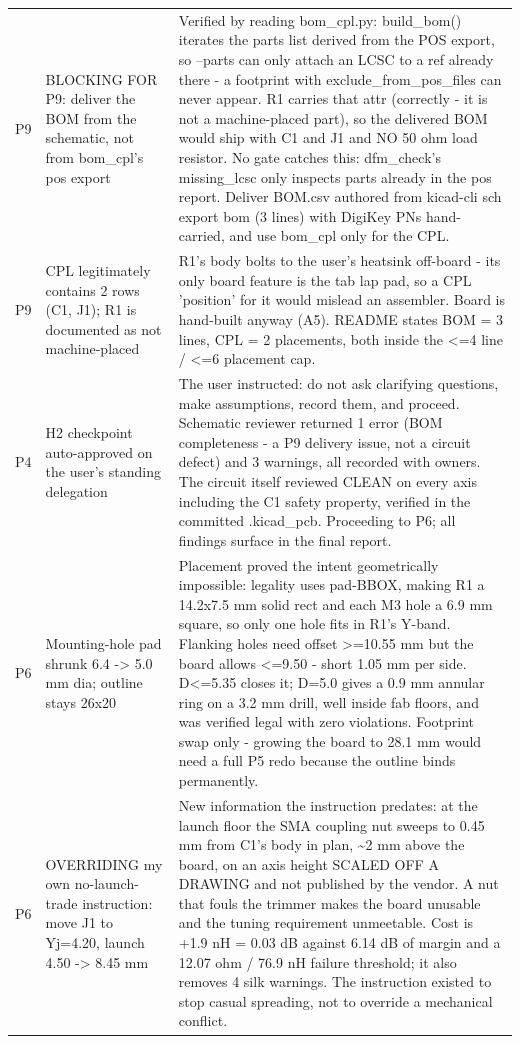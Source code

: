 \documentclass[11pt,a4paper]{article}
\begin{document}
{\begin{longtable}{lp{5.2cm}p{7.2cm}}
P9 & BLOCKING FOR P9: deliver the BOM from the schematic, not from bom\_cpl's pos export & Verified by reading bom\_cpl.py: build\_bom() iterates the parts list derived from the POS export, so --parts can only attach an LCSC to a ref already there - a footprint with exclude\_from\_pos\_files can never appear. R1 carries that attr (correctly - it is not a machine-placed part), so the delivered BOM would ship with C1 and J1 and NO 50 ohm load resistor. No gate catches this: dfm\_check's missing\_lcsc only inspects parts already in the pos report. Deliver BOM.csv authored from kicad-cli sch export bom (3 lines) with DigiKey PNs hand-carried, and use bom\_cpl only for the CPL. \\
P9 & CPL legitimately contains 2 rows (C1, J1); R1 is documented as not machine-placed & R1's body bolts to the user's heatsink off-board - its only board feature is the tab lap pad, so a CPL 'position' for it would mislead an assembler. Board is hand-built anyway (A5). README states BOM = 3 lines, CPL = 2 placements, both inside the \textless{}=4 line / \textless{}=6 placement cap. \\
P4 & H2 checkpoint auto-approved on the user's standing delegation & The user instructed: do not ask clarifying questions, make assumptions, record them, and proceed. Schematic reviewer returned 1 error (BOM completeness - a P9 delivery issue, not a circuit defect) and 3 warnings, all recorded with owners. The circuit itself reviewed CLEAN on every axis including the C1 safety property, verified in the committed .kicad\_pcb. Proceeding to P6; all findings surface in the final report. \\
P6 & Mounting-hole pad shrunk 6.4 -\textgreater{} 5.0 mm dia; outline stays 26x20 & Placement proved the intent geometrically impossible: legality uses pad-BBOX, making R1 a 14.2x7.5 mm solid rect and each M3 hole a 6.9 mm square, so only one hole fits in R1's Y-band. Flanking holes need offset \textgreater{}=10.55 mm but the board allows \textless{}=9.50 - short 1.05 mm per side. D\textless{}=5.35 closes it; D=5.0 gives a 0.9 mm annular ring on a 3.2 mm drill, well inside fab floors, and was verified legal with zero violations. Footprint swap only - growing the board to 28.1 mm would need a full P5 redo because the outline binds permanently. \\
P6 & OVERRIDING my own no-launch-trade instruction: move J1 to Yj=4.20, launch 4.50 -\textgreater{} 8.45 mm & New information the instruction predates: at the launch floor the SMA coupling nut sweeps to 0.45 mm from C1's body in plan, \textasciitilde{}2 mm above the board, on an axis height SCALED OFF A DRAWING and not published by the vendor. A nut that fouls the trimmer makes the board unusable and the tuning requirement unmeetable. Cost is +1.9 nH = 0.03 dB against 6.14 dB of margin and a 12.07 ohm / 76.9 nH failure threshold; it also removes 4 silk warnings. The instruction existed to stop casual spreading, not to override a mechanical conflict. \\

\end{longtable}}
\end{document}
